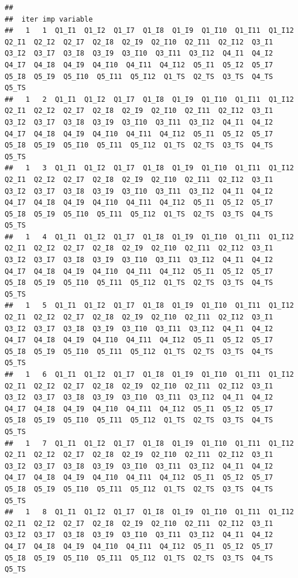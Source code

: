 \documentclass[]{book}
\begin{document}
\begin{verbatim}
## 
##  iter imp variable
##   1   1  Q1_I1  Q1_I2  Q1_I7  Q1_I8  Q1_I9  Q1_I10  Q1_I11  Q1_I12  Q2_I1  Q2_I2  Q2_I7  Q2_I8  Q2_I9  Q2_I10  Q2_I11  Q2_I12  Q3_I1  Q3_I2  Q3_I7  Q3_I8  Q3_I9  Q3_I10  Q3_I11  Q3_I12  Q4_I1  Q4_I2  Q4_I7  Q4_I8  Q4_I9  Q4_I10  Q4_I11  Q4_I12  Q5_I1  Q5_I2  Q5_I7  Q5_I8  Q5_I9  Q5_I10  Q5_I11  Q5_I12  Q1_TS  Q2_TS  Q3_TS  Q4_TS  Q5_TS
##   1   2  Q1_I1  Q1_I2  Q1_I7  Q1_I8  Q1_I9  Q1_I10  Q1_I11  Q1_I12  Q2_I1  Q2_I2  Q2_I7  Q2_I8  Q2_I9  Q2_I10  Q2_I11  Q2_I12  Q3_I1  Q3_I2  Q3_I7  Q3_I8  Q3_I9  Q3_I10  Q3_I11  Q3_I12  Q4_I1  Q4_I2  Q4_I7  Q4_I8  Q4_I9  Q4_I10  Q4_I11  Q4_I12  Q5_I1  Q5_I2  Q5_I7  Q5_I8  Q5_I9  Q5_I10  Q5_I11  Q5_I12  Q1_TS  Q2_TS  Q3_TS  Q4_TS  Q5_TS
##   1   3  Q1_I1  Q1_I2  Q1_I7  Q1_I8  Q1_I9  Q1_I10  Q1_I11  Q1_I12  Q2_I1  Q2_I2  Q2_I7  Q2_I8  Q2_I9  Q2_I10  Q2_I11  Q2_I12  Q3_I1  Q3_I2  Q3_I7  Q3_I8  Q3_I9  Q3_I10  Q3_I11  Q3_I12  Q4_I1  Q4_I2  Q4_I7  Q4_I8  Q4_I9  Q4_I10  Q4_I11  Q4_I12  Q5_I1  Q5_I2  Q5_I7  Q5_I8  Q5_I9  Q5_I10  Q5_I11  Q5_I12  Q1_TS  Q2_TS  Q3_TS  Q4_TS  Q5_TS
##   1   4  Q1_I1  Q1_I2  Q1_I7  Q1_I8  Q1_I9  Q1_I10  Q1_I11  Q1_I12  Q2_I1  Q2_I2  Q2_I7  Q2_I8  Q2_I9  Q2_I10  Q2_I11  Q2_I12  Q3_I1  Q3_I2  Q3_I7  Q3_I8  Q3_I9  Q3_I10  Q3_I11  Q3_I12  Q4_I1  Q4_I2  Q4_I7  Q4_I8  Q4_I9  Q4_I10  Q4_I11  Q4_I12  Q5_I1  Q5_I2  Q5_I7  Q5_I8  Q5_I9  Q5_I10  Q5_I11  Q5_I12  Q1_TS  Q2_TS  Q3_TS  Q4_TS  Q5_TS
##   1   5  Q1_I1  Q1_I2  Q1_I7  Q1_I8  Q1_I9  Q1_I10  Q1_I11  Q1_I12  Q2_I1  Q2_I2  Q2_I7  Q2_I8  Q2_I9  Q2_I10  Q2_I11  Q2_I12  Q3_I1  Q3_I2  Q3_I7  Q3_I8  Q3_I9  Q3_I10  Q3_I11  Q3_I12  Q4_I1  Q4_I2  Q4_I7  Q4_I8  Q4_I9  Q4_I10  Q4_I11  Q4_I12  Q5_I1  Q5_I2  Q5_I7  Q5_I8  Q5_I9  Q5_I10  Q5_I11  Q5_I12  Q1_TS  Q2_TS  Q3_TS  Q4_TS  Q5_TS
##   1   6  Q1_I1  Q1_I2  Q1_I7  Q1_I8  Q1_I9  Q1_I10  Q1_I11  Q1_I12  Q2_I1  Q2_I2  Q2_I7  Q2_I8  Q2_I9  Q2_I10  Q2_I11  Q2_I12  Q3_I1  Q3_I2  Q3_I7  Q3_I8  Q3_I9  Q3_I10  Q3_I11  Q3_I12  Q4_I1  Q4_I2  Q4_I7  Q4_I8  Q4_I9  Q4_I10  Q4_I11  Q4_I12  Q5_I1  Q5_I2  Q5_I7  Q5_I8  Q5_I9  Q5_I10  Q5_I11  Q5_I12  Q1_TS  Q2_TS  Q3_TS  Q4_TS  Q5_TS
##   1   7  Q1_I1  Q1_I2  Q1_I7  Q1_I8  Q1_I9  Q1_I10  Q1_I11  Q1_I12  Q2_I1  Q2_I2  Q2_I7  Q2_I8  Q2_I9  Q2_I10  Q2_I11  Q2_I12  Q3_I1  Q3_I2  Q3_I7  Q3_I8  Q3_I9  Q3_I10  Q3_I11  Q3_I12  Q4_I1  Q4_I2  Q4_I7  Q4_I8  Q4_I9  Q4_I10  Q4_I11  Q4_I12  Q5_I1  Q5_I2  Q5_I7  Q5_I8  Q5_I9  Q5_I10  Q5_I11  Q5_I12  Q1_TS  Q2_TS  Q3_TS  Q4_TS  Q5_TS
##   1   8  Q1_I1  Q1_I2  Q1_I7  Q1_I8  Q1_I9  Q1_I10  Q1_I11  Q1_I12  Q2_I1  Q2_I2  Q2_I7  Q2_I8  Q2_I9  Q2_I10  Q2_I11  Q2_I12  Q3_I1  Q3_I2  Q3_I7  Q3_I8  Q3_I9  Q3_I10  Q3_I11  Q3_I12  Q4_I1  Q4_I2  Q4_I7  Q4_I8  Q4_I9  Q4_I10  Q4_I11  Q4_I12  Q5_I1  Q5_I2  Q5_I7  Q5_I8  Q5_I9  Q5_I10  Q5_I11  Q5_I12  Q1_TS  Q2_TS  Q3_TS  Q4_TS  Q5_TS

\end{verbatim}
\end{document}
